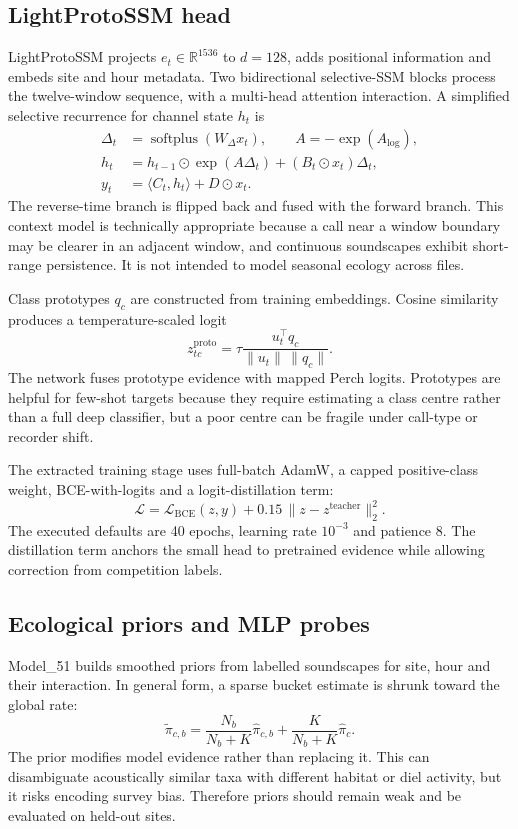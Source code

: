 \documentclass[10pt,a4paper]{article}
\begin{document}
\subsection{LightProtoSSM head}
LightProtoSSM projects $e_t\in\mathbb{R}^{1536}$ to $d=128$, adds positional information and embeds site and hour metadata. Two bidirectional selective-SSM blocks process the twelve-window sequence, with a multi-head attention interaction. A simplified selective recurrence for channel state $h_t$ is
\begin{align}
\Delta_t &= \operatorname{softplus}(W_\Delta x_t), \qquad A=-\exp(A_{\log}),\\
h_t &= h_{t-1}\odot \exp(A\Delta_t) + (B_t\odot x_t)\Delta_t,\\
y_t &= \langle C_t,h_t\rangle + D\odot x_t.
\end{align}
The reverse-time branch is flipped back and fused with the forward branch. This context model is technically appropriate because a call near a window boundary may be clearer in an adjacent window, and continuous soundscapes exhibit short-range persistence. It is not intended to model seasonal ecology across files.

Class prototypes $q_c$ are constructed from training embeddings. Cosine similarity produces a temperature-scaled logit
\begin{equation}
z^{\mathrm{proto}}_{tc}=\tau\frac{u_t^\top q_c}{\|u_t\|\,\|q_c\|}.
\end{equation}
The network fuses prototype evidence with mapped Perch logits. Prototypes are helpful for few-shot targets because they require estimating a class centre rather than a full deep classifier, but a poor centre can be fragile under call-type or recorder shift.

The extracted training stage uses full-batch AdamW, a capped positive-class weight, BCE-with-logits and a logit-distillation term:
\begin{equation}
\mathcal{L}=\mathcal{L}_{\mathrm{BCE}}(z,y)+0.15\,\|z-z^{\mathrm{teacher}}\|_2^2.
\end{equation}
The executed defaults are 40 epochs, learning rate $10^{-3}$ and patience 8. The distillation term anchors the small head to pretrained evidence while allowing correction from competition labels.

\subsection{Ecological priors and MLP probes}
Model\_51 builds smoothed priors from labelled soundscapes for site, hour and their interaction. In general form, a sparse bucket estimate is shrunk toward the global rate:
\begin{equation}
\tilde\pi_{c,b}=\frac{N_b}{N_b+K}\hat\pi_{c,b}+\frac{K}{N_b+K}\hat\pi_c.
\end{equation}
The prior modifies model evidence rather than replacing it. This can disambiguate acoustically similar taxa with different habitat or diel activity, but it risks encoding survey bias. Therefore priors should remain weak and be evaluated on held-out sites.
\end{document}
